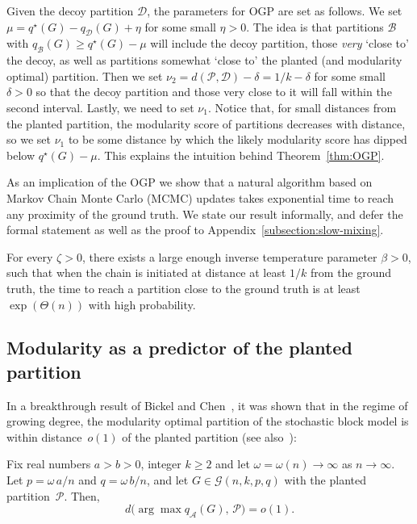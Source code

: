\documentclass[a4paper,UKenglish,cleveref, autoref, thm-restate,numberwithinsect]{lipics-v2021}
\newcommand{\cA}{\mathcal{A}}
\newcommand{\cB}{\mathcal{B}}
\newcommand{\cD}{\mathcal{D}}
\newcommand{\cP}{\mathcal{P}}
\newcommand{\q}{q^{\star}}
\begin{document}
Given the decoy partition $\cD$, the parameters for OGP are set as follows.
We set $\mu = \q(G)-q_\mathcal{D}(G)+\eta$ for some small $\eta>0$. The idea is that partitions $\cB$ with $q_\cB(G)\geq \q(G) - \mu$ will include the decoy partition, those \emph{very} `close to' the decoy, as well as partitions somewhat `close to' the planted (and modularity optimal) partition.
%
Then we set $\nu_2 = d(\cP, \mathcal{D})-\delta = 1/k - \delta$ for some small $\delta>0$ so that the decoy partition and those very close to it will fall within the second interval. Lastly, we need to set $\nu_1$. Notice that, for small distances from the planted partition, the modularity score of partitions decreases with distance, so we set $\nu_1$ to be some distance by which the likely modularity score has dipped below $\q(G)-\mu$. This explains the intuition behind Theorem~\ref{thm:OGP}.

As an implication of the OGP we show that a natural algorithm based on Markov Chain 
Monte Carlo (MCMC) updates takes exponential time to reach any proximity of the 
ground truth. We state our result informally, and defer the formal statement as well as the proof to Appendix~\ref{subsection:slow-mixing}.
%
%
\begin{theorem}[Informal]\label{thm:slow_mixing_informal}
For every $\zeta>0$, there exists a large enough inverse temperature parameter
$\beta>0$, such that when the chain is initiated at distance
at least $1/k$ from the ground truth, the time to reach a partition close
to the ground truth is at least $\exp(\Theta(n))$ with high probability.
\end{theorem}



\subsection{Modularity as a predictor of the planted partition}\label{subsec:close_is_close}

In a breakthrough result of Bickel and Chen~\cite{bickel2009nonparametric}, it was shown that in the regime of growing degree, the modularity optimal partition of the stochastic block model is within distance~$o(1)$ of the planted partition (see also~\cite{bickel2015correction}): 

\begin{theorem}
\label{thm.SBMrecovery}
Fix real numbers $a>b>0$, integer $k\geq 2$ and let $\omega=\omega(n) \to \infty$ as $n \to \infty$. 
%
Let $p=\omega\, a/n$ and $q=\omega\, b /n$, and let $G \in \mathcal{G}(n,k,p,q)$ with the planted partition~$\cP$. Then,
\[
d\big( \arg \max q_\cA(G) , \, \cP \big) = o(1).
\]
\end{theorem}
\end{document}
